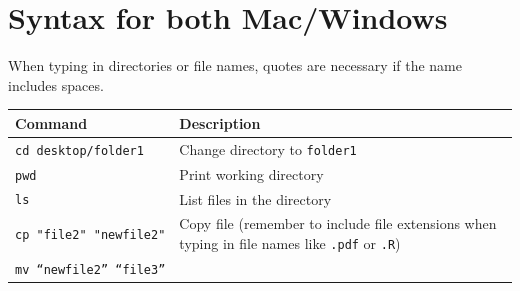 \documentclass[]{book}
\begin{document}
\hypertarget{syntax-for-both-macwindows}{%
\section{Syntax for both Mac/Windows}\label{syntax-for-both-macwindows}}

When typing in directories or file names, quotes are necessary if the name includes spaces.

\begin{longtable}[]{@{}ll@{}}
\toprule
\begin{minipage}[b]{0.41\columnwidth}\raggedright
Command\strut
\end{minipage} & \begin{minipage}[b]{0.53\columnwidth}\raggedright
Description\strut
\end{minipage}\tabularnewline
\midrule
\endhead
\begin{minipage}[t]{0.41\columnwidth}\raggedright
\texttt{cd\ desktop/folder1}\strut
\end{minipage} & \begin{minipage}[t]{0.53\columnwidth}\raggedright
Change directory to \texttt{folder1}\strut
\end{minipage}\tabularnewline
\begin{minipage}[t]{0.41\columnwidth}\raggedright
\texttt{pwd}\strut
\end{minipage} & \begin{minipage}[t]{0.53\columnwidth}\raggedright
Print working directory\strut
\end{minipage}\tabularnewline
\begin{minipage}[t]{0.41\columnwidth}\raggedright
\texttt{ls}\strut
\end{minipage} & \begin{minipage}[t]{0.53\columnwidth}\raggedright
List files in the directory\strut
\end{minipage}\tabularnewline
\begin{minipage}[t]{0.41\columnwidth}\raggedright
\texttt{cp\ "file2"\ "newfile2"}\strut
\end{minipage} & \begin{minipage}[t]{0.53\columnwidth}\raggedright
Copy file (remember to include file extensions when typing in file names like \texttt{.pdf} or \texttt{.R})\strut
\end{minipage}\tabularnewline
\begin{minipage}[t]{0.41\columnwidth}\raggedright
\texttt{mv\ “newfile2”\ “file3”}\strut
\end{minipage} & \begin{minipage}[t]{0.53\columnwidth}\raggedright

\end{minipage}
\end{longtable}
\end{document}
